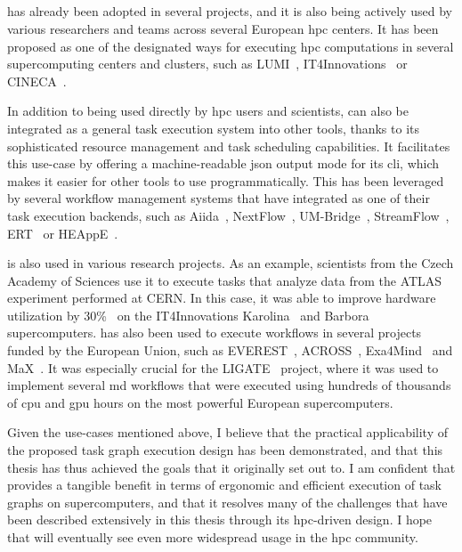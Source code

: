 \subsection*{\hyperqueue{}}
\hyperqueue{} has already been adopted in several projects, and it is also being
actively used by various researchers and teams across several European \gls{hpc}
centers. It has been proposed as one of the designated ways for executing
\gls{hpc} computations in several supercomputing centers and clusters, such as
LUMI~\cite{it4i-lumi}, IT4Innovations~\cite{it4i-hq} or
CINECA~\cite{cineca}.

In addition to being used directly by \gls{hpc} users and scientists,
\hyperqueue{} can also be integrated as a general task execution system into other
tools, thanks to its sophisticated resource management and task scheduling capabilities. It
facilitates this use-case by offering a machine-readable \gls{json} output mode for
its \gls{cli}, which makes it easier for other tools to use
\hyperqueue{} programmatically. This has been leveraged by several workflow management
systems that have integrated \hyperqueue{} as one of their task execution backends,
such as Aiida~\cite{aiida-hq}, NextFlow~\cite{nextflow-hq},
UM-Bridge~\cite{umbridge}, StreamFlow~\cite{streamflow-hq},
ERT~\cite{ert} or HEAppE~\cite{heappe}.

\hyperqueue{} is also used in various research projects. As an example,
scientists from the Czech Academy of Sciences use it to execute tasks that analyze data from the
ATLAS~\cite{atlas} experiment performed at CERN. In this case, it was able to improve
hardware utilization by 30\%~\cite{cern-hq} on the IT4Innovations
Karolina~\cite{karolina} and Barbora~\cite{barbora} supercomputers.
\hyperqueue{} has also been used to execute workflows in several projects funded by
the European Union, such as EVEREST~\cite{everest}, ACROSS~\cite{across},
Exa4Mind~\cite{exa4mind} and MaX~\cite{max}. It was especially crucial
for the LIGATE~\cite{ligate} project, where it was used to implement several
\gls{md} workflows that were executed using hundreds of thousands of
\gls{cpu} and \gls{gpu} hours on the most powerful European
supercomputers.

Given the use-cases mentioned above, I believe that the practical applicability of the proposed
task graph execution design has been demonstrated, and that this thesis has thus achieved the goals
that it originally set out to. I am confident that \hyperqueue{} provides a tangible
benefit in terms of ergonomic and efficient execution of task graphs on supercomputers, and that it
resolves many of the challenges that have been described extensively in this thesis through its
\gls{hpc}-driven design. I hope that \hyperqueue{} will eventually
see even more widespread usage in the \gls{hpc} community.
